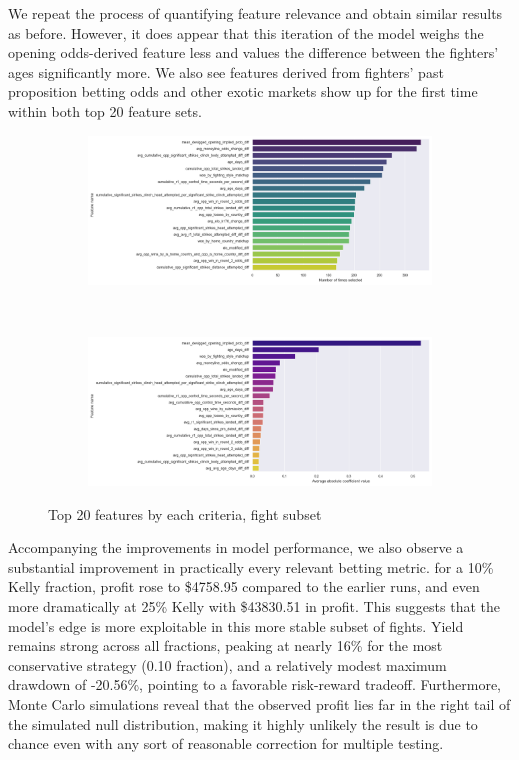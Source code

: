 \documentclass[12pt,twoside]{report}
\begin{document}
We repeat the process of quantifying feature relevance and obtain similar results as before. However, it does appear that this iteration of the model weighs the opening odds-derived feature less and values the difference between the fighters' ages significantly more. We also see features derived from fighters' past proposition betting odds and other exotic markets show up for the first time within both top 20 feature sets.

\begin{figure}[!htb]
\centering
\captionsetup{justification=centering}
\begin{subfigure}{0.8\linewidth}
  \centering
  \includegraphics[width=\linewidth]{figures/lr_case_study_feature_selection_freq.png}
\end{subfigure}\\
\begin{subfigure}{0.8\linewidth}
  \centering
  \includegraphics[width=\linewidth]{figures/lr_case_study_feature_avg_abs_coef.png}
\end{subfigure}
\caption{Top 20 features by each criteria, fight subset}
\end{figure}

Accompanying the improvements in model performance, we also observe a substantial improvement in practically every relevant betting metric. for a 10\% Kelly fraction, profit rose to \$4758.95 compared to the earlier runs, and even more dramatically at 25\% Kelly with \$43830.51 in profit. This suggests that the model’s edge is more exploitable in this more stable subset of fights. Yield remains strong across all fractions, peaking at nearly 16\% for the most conservative strategy (0.10 fraction), and a relatively modest maximum drawdown of -20.56\%, pointing to a favorable risk-reward tradeoff. Furthermore, Monte Carlo simulations reveal that the observed profit lies far in the right tail of the simulated null distribution, making it highly unlikely the result is due to chance even with any sort of reasonable correction for multiple testing.
\end{document}
